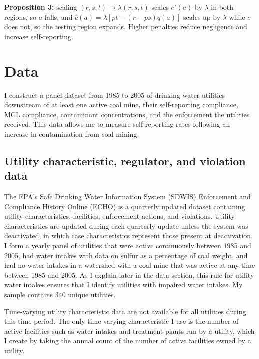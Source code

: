 \documentclass[12pt]{article}
\begin{document}
\textbf{Proposition 3:} scaling $(r,s,t) \to \lambda(r,s,t)$ scales $e'(a)$ by $\lambda$ in both regions, so $a$ falls; and $\hat{c}(a) = \lambda\left[pt - (r-ps)q(a)\right]$ scales up by $\lambda$ while $c$ does not, so the testing region expands. Higher penalties reduce negligence and increase self-reporting.

\section{Data}

I construct a panel dataset from 1985 to 2005 of drinking water utilities downstream of at least one active coal mine, their self-reporting compliance, MCL compliance, contaminant concentrations, and the enforcement the utilities received. This data allows me to measure self-reporting rates following an increase in contamination from coal mining.

\subsection{Utility characteristic, regulator, and violation data}

The EPA's Safe Drinking Water Information System (SDWIS) Enforcement and Compliance History Online (ECHO) is a quarterly updated dataset containing utility characteristics, facilities, enforcement actions, and violations. Utility characteristics are updated during each quarterly update unless the system was deactivated, in which case characteristics represent those present at deactivation. I form a yearly panel of utilities that were active continuously between 1985 and 2005, had water intakes with data on sulfur as a percentage of coal weight, and had no water intakes in a watershed with a coal mine that was active at any time between 1985 and 2005. As I explain later in the data section, this rule for utility water intakes ensures that I identify utilities with impaired water intakes. My sample contains 340 unique utilities. 

Time-varying utility characteristic data are not available for all utilities during this time period. The only time-varying characteristic I use is the number of active facilities such as water intakes and treatment plants run by a utility, which I create by taking the annual count of the number of active facilities owned by a utility. 
\end{document}
